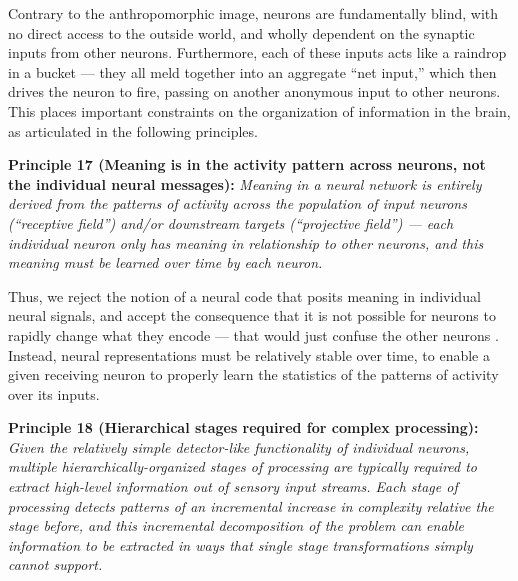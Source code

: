 \documentclass[11pt,twoside]{article}
\begin{document}
Contrary to the anthropomorphic image, neurons are fundamentally blind, with
no direct access to the outside world, and wholly dependent on the synaptic
inputs from other neurons.  Furthermore, each of these inputs acts like a
raindrop in a bucket --- they all meld together into an aggregate ``net
input,'' which then drives the neuron to fire, passing on another anonymous
input to other neurons.  This places important constraints on the organization
of information in the brain, as articulated in the following principles.

{\bf Principle 17 (Meaning is in the activity pattern across neurons, not the individual neural messages):} {\em Meaning in a neural network is entirely derived from the patterns of activity across the population of input neurons (``receptive field'') and/or downstream targets (``projective field'') --- each individual neuron only has meaning in relationship to other neurons, and this meaning must be learned over time by each neuron.}

Thus, we reject the notion of a neural code that posits meaning in individual
neural signals, and accept the consequence that it is not possible for neurons
to rapidly change what they encode --- that would just confuse the other
neurons \cite{OReilly10}.  Instead, neural representations must be relatively
stable over time, to enable a given receiving neuron to properly learn the
statistics of the patterns of activity over its inputs.

{\bf Principle 18 (Hierarchical stages required for complex processing):} {\em
  Given the relatively simple detector-like functionality of individual
  neurons, multiple hierarchically-organized stages of processing are
  typically required to extract high-level information out of sensory input
  streams.  Each stage of processing detects patterns of an incremental
  increase in complexity relative the stage before, and this incremental
  decomposition of the problem can enable information to be extracted in ways
  that single stage transformations simply cannot support.}
\end{document}
